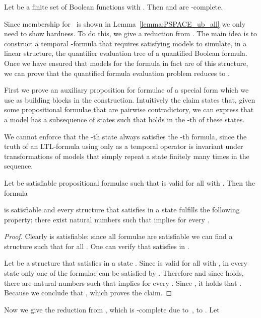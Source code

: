 \begin{theorem}\label{theorem:SAT(S;BF) SAT(S|U;S1) PSPACE-h}
Let  be a finite set of Boolean functions with .
        Then  and  are \PSPACE-complete.
\end{theorem}


  \proof Since membership for \PSPACE\ is shown in Lemma~\ref{lemma:PSPACE_ub_all} we only need to show hardness. To do this, we give a reduction from . The main idea is to construct a temporal -formula that requires satisfying models to simulate, in a linear structure, the quantifier evaluation tree of a quantified Boolean formula. Once we have ensured that models for the formula in fact are of this structure, we can prove that the quantified formula evaluation problem reduces to .

    First we prove an auxiliary proposition for formulae of a special form which we use as building blocks in the construction. Intuitively the claim states that, given some propositional formulae  that are pairwise contradictory, we can express that a model has a subsequence of states such that  holds in the -th of these states.

    We cannot enforce that the -th state always satisfies the -th formula, since the truth of an LTL-formula using only  as a temporal operator is invariant under transformations of models that simply repeat a state finitely many times in the sequence.

        \begin{claim}
          Let  be satisfiable propositional formulae such that  is valid for all  with . Then the formula
          
          is satisfiable and every structure  that satisfies  in a state  fulfills the following property: there exist natural numbers  such that  implies  for every .
        \end{claim}
        \begin{proof}
          Clearly  is satisfiable: since all formulae  are satisfiable we can find a structure  such that  for all . One can verify that  satisfies  in .

          Let  be a structure that satisfies  in a state . Since  is valid for all  with , in every state only one of the formulae  can be satisfied by . Therefore and since  holds, there are natural numbers  such that  implies  for every . Since , it holds that . Because  we conclude that , which proves the claim.
        \end{proof}
        Now we give the reduction from , which is \PSPACE-complete due to~\cite{sto77}, to . Let

